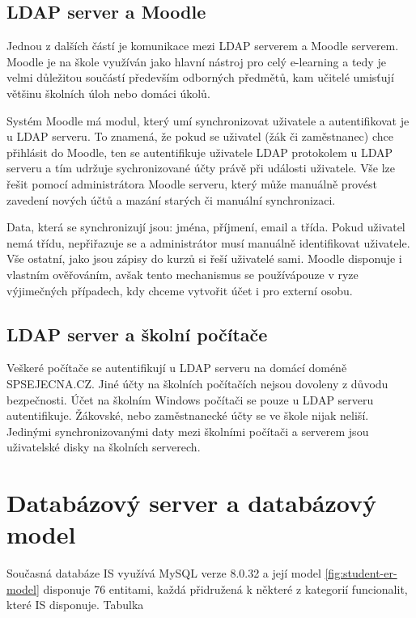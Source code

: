 \documentclass[FM,Proj]{tulthesis}
\begin{document}
\subsection{LDAP server a Moodle}
\label{section:ldap-server-a-moodle}
Jednou z dalších částí je komunikace mezi LDAP serverem a Moodle serverem. Moodle je na škole
využíván jako hlavní nástroj pro celý e-learning a tedy je velmi důležitou součástí především
odborných předmětů, kam učitelé umisťují většinu školních úloh nebo domáci úkolů.

Systém Moodle má modul, který umí synchronizovat uživatele a autentifikovat je u LDAP serveru.
To znamená, že pokud se uživatel (žák či zaměstnanec) chce přihlásit do Moodle, ten se 
autentifikuje uživatele LDAP protokolem u LDAP serveru a tím udržuje sychronizované účty právě
při události uživatele.
Vše lze řešit pomocí administrátora Moodle serveru, který může manuálně provést zavedení 
nových účtů a mazání starých či manuální synchronizaci.

Data, která se synchronizují jsou: jména, příjmení, email a třída. Pokud uživatel nemá třídu,
nepřiřazuje se a administrátor musí manuálně identifikovat uživatele. Vše ostatní, jako jsou 
zápisy do kurzů si řeší uživatelé sami. Moodle disponuje i vlastním ověřováním, avšak tento
mechanismus se používápouze  v ryze výjimečných případech, kdy chceme vytvořit účet i pro 
externí osobu.

\subsection{LDAP server a školní počítače}
\label{section:ldap-server-a-skolni-pocitace}
Veškeré počítače se autentifikují u LDAP serveru na domácí doméně SPSEJECNA.CZ. Jiné účty
na školních počítačích nejsou dovoleny z důvodu bezpečnosti.
Účet na školním Windows počítači se pouze u LDAP serveru autentifikuje. Žákovské, nebo
zaměstnanecké účty se ve škole nijak neliší. Jedinými synchronizovanými daty mezi školními
počítači a serverem jsou uživatelské disky na školních serverech.

\section{Databázový server a databázový model}
Současná databáze IS využívá MySQL verze 8.0.32 a její model \ref{fig:student-er-model}
disponuje 76 entitami, každá přidružená k některé z kategorií funcionalit, které IS disponuje.
Tabulka 
\end{document}
